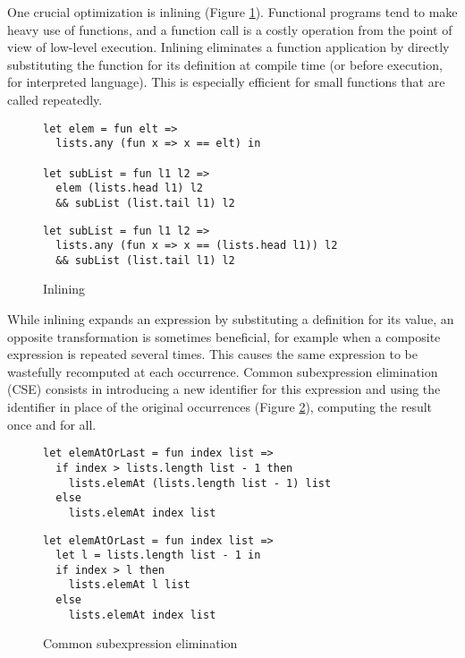 \documentclass[sigplan,10pt,review,anonymous]{acmart}
\newcommand{\info}[2][1=]{}
\begin{document}
One crucial optimization is
inlining (Figure \ref{fig:optimizations-inlining-ex}). Functional programs tend
to make heavy use of functions, and a function call is a costly operation from
the point of view of low-level execution. Inlining eliminates a function
application by directly substituting the function for its definition at compile
time (or before execution, for interpreted language). This is especially
efficient for small functions that are called repeatedly.

\info{I think it's better to use [h] on figures, we can discuss it}
\begin{figure}[h]
  \begin{center}
\begin{lstlisting}[language=nickel,title={Source program}]
let elem = fun elt =>
  lists.any (fun x => x == elt) in

let subList = fun l1 l2 =>
  elem (lists.head l1) l2
  && subList (list.tail l1) l2
\end{lstlisting}
\begin{lstlisting}[language=nickel,title={Optimized program}]
let subList = fun l1 l2 =>
  lists.any (fun x => x == (lists.head l1)) l2
  && subList (list.tail l1) l2
\end{lstlisting}
  \end{center}
\caption{Inlining}
\label{fig:optimizations-inlining-ex}
\end{figure}

While inlining expands an expression by substituting a definition for its value,
an opposite transformation is sometimes beneficial, for example when a composite
expression is repeated several times. This causes the same expression to be
wastefully recomputed at each occurrence. Common subexpression elimination (CSE)
consists in introducing a new identifier for this expression and using the
identifier in place of the original occurrences
(Figure \ref{fig:optimizations-cse-ex}), computing the result once and for all.

\begin{figure}[h]
  \begin{center}
\begin{lstlisting}[language=nickel,title={Source program}]
let elemAtOrLast = fun index list =>
  if index > lists.length list - 1 then
    lists.elemAt (lists.length list - 1) list
  else
    lists.elemAt index list
\end{lstlisting}
\begin{lstlisting}[language=nickel,title={Optimized program}]
let elemAtOrLast = fun index list =>
  let l = lists.length list - 1 in
  if index > l then
    lists.elemAt l list
  else
    lists.elemAt index list
\end{lstlisting}
  \end{center}
\caption{Common subexpression elimination}
\label{fig:optimizations-cse-ex}
\end{figure}
\end{document}
